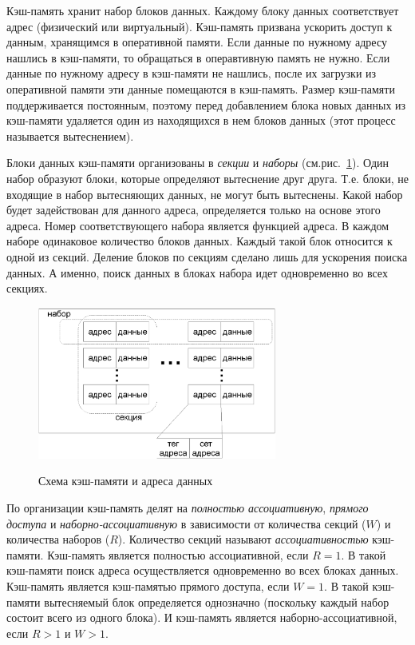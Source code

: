 \documentclass[14pt]{extreport}
\begin{document}
Кэш-память хранит набор блоков данных. Каждому блоку данных соответствует адрес (физический или виртуальный). Кэш-память призвана ускорить доступ к данным, хранящимся в оперативной памяти. Если данные по нужному адресу нашлись в кэш-памяти, то обращаться в операвтивную память не нужно. Если данные по нужному адресу в кэш-памяти не нашлись, после их загрузки из оперативной памяти эти данные помещаются в кэш-память. Размер кэш-памяти поддерживается постоянным, поэтому перед добавлением блока новых данных из кэш-памяти удаляется один из находящихся в нем блоков данных (этот процесс называется вытеснением).

Блоки данных кэш-памяти организованы в \emph{секции} и \emph{наборы} (см.рис.~\ref{fig:cache_model}). Один набор образуют блоки, которые определяют вытеснение друг друга. Т.е. блоки, не входящие в набор вытесняющих данных, не могут быть вытеснены. Какой набор будет задействован для данного адреса, определяется только на основе этого адреса. Номер соответствующего набора является функцией адреса. В каждом наборе одинаковое количество блоков данных. Каждый такой блок относится к одной из секций. Деление блоков по секциям сделано лишь для ускорения поиска данных. А именно, поиск данных в блоках набора идет одновременно во всех секциях.

\begin{figure}[h] \center
  \includegraphics[width=0.7\textwidth]{1.review/cache}\\
  \caption{Схема кэш-памяти и адреса данных}\label{fig:cache_model}
\end{figure}

По организации кэш-память делят на \emph{полностью ассоциативную}, \emph{прямого доступа} и \emph{наборно-ассоциативную} в зависимости от количества секций ($W$) и количества наборов ($R$). Количество секций называют \emph{ассоциативностью} кэш-памяти. Кэш-память является полностью ассоциативной, если $R = 1$. В такой кэш-памяти поиск адреса осуществляется одновременно во всех блоках данных. Кэш-память является кэш-памятью прямого доступа, если $W = 1$. В такой кэш-памяти вытесняемый блок определяется однозначно (поскольку каждый набор состоит всего из одного блока). И кэш-память является наборно-ассоциативной, если $R > 1$ и $W > 1$.
\end{document}
